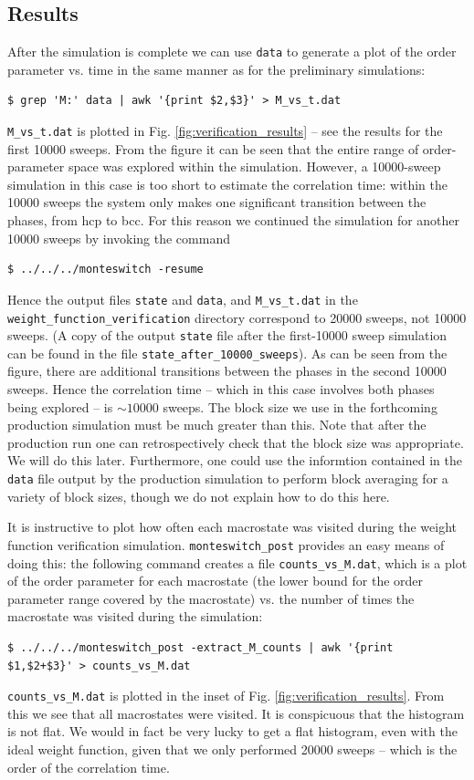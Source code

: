 \documentclass{report}
\begin{document}
\subsection{Results}
After the simulation is complete we can use \texttt{data} to generate a plot of the order parameter vs. time in the same manner as for the
preliminary simulations:
\begin{verbatim}
$ grep 'M:' data | awk '{print $2,$3}' > M_vs_t.dat
\end{verbatim}
\texttt{M\_vs\_t.dat} is plotted in Fig. \ref{fig:verification_results} -- see the results for the first 10000 sweeps. From the figure it can be seen
that the entire range of order-parameter space was explored within the simulation. However, a 10000-sweep simulation in this case is too short to
estimate the correlation time: within the 10000 sweeps the system only makes one significant transition between the phases, from hcp to bcc. For 
this reason we continued the simulation for another 10000 sweeps by invoking the command
\begin{verbatim}
$ ../../../monteswitch -resume
\end{verbatim}
Hence the output files \texttt{state} and \texttt{data}, and \texttt{M\_vs\_t.dat} in the \texttt{weight\_function\_verification} directory correspond
to 20000 sweeps, not 10000 sweeps. (A copy of the output \texttt{state} file after the first-10000 sweep simulation can be found in the file 
\texttt{state\_after\_10000\_sweeps}). As can be seen from the figure, there are additional transitions between the phases in the second 10000 sweeps. 
Hence the correlation time -- which in this case involves both phases being explored -- is $\sim 10000$ sweeps. The 
block size we use in the forthcoming production simulation must be much greater than this. Note that after the production run one can 
retrospectively check that the block size was appropriate. We will do this later. Furthermore, one could use the informtion contained in the \texttt{data} 
file output by the production simulation to perform block averaging for a variety of block sizes, though we do not explain how to do this here.

It is instructive to plot how often each macrostate was visited during the weight function verification simulation. \texttt{monteswitch\_post}
provides an easy means of doing this: the following command creates a file \texttt{counts\_vs\_M.dat}, which is a plot of the order 
parameter for each macrostate (the lower bound for the order parameter range covered by the macrostate) vs. the number of times the macrostate 
was visited during the simulation:
\begin{verbatim}
$ ../../../monteswitch_post -extract_M_counts | awk '{print 
$1,$2+$3}' > counts_vs_M.dat
\end{verbatim}
\texttt{counts\_vs\_M.dat} is plotted in the inset of Fig. \ref{fig:verification_results}. From this we see that all macrostates were visited.
It is conspicuous that the histogram is not flat. We would in fact be very lucky to get a flat histogram, even with the ideal weight function, given 
that we only performed 20000 sweeps -- which is the order of the correlation time.
\end{document}
